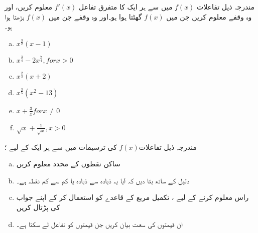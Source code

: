 مندرجہ ذیل تفاعلات 	  \(f(x)\) 	میں سے ہر ایک کا متفرق تفاعل 	\( f\prime (x)\)	معلوم کریں، اور وہ وقفے معلوم کریں جن میں 	  \(f(x)\) 	گھٹتا ہوا ہو۔اور وہ وقفے جن میں 		  \(f(x)\) بڑھتا ہوا ہو۔
\begin{multicols}{3}
\begin{enumerate}[a.]
\item \(  x^{\frac{3}{2}}(x-1) \hspace{50pt}  \)
\item \(  x^{\frac{3}{4}}-2x^{\frac{7}{4}},for x>0 \hspace{50pt}   \)
\item  \(x^{\frac{2}{3}}(x+2)\)
\item  \(x^{\frac{3}{5}}(x^{2}-13) \hspace{50pt}  \)
\item  \( x+\frac{3}{x} for x\neq 0 \hspace{50pt}    \)
\item \( \sqrt{x}+\frac{1}{\sqrt{x}},x>0    \)
\end{enumerate}
\end{multicols}
مندرجہ ذیل تفاعلات\(f(x)\) کی ترسیمات میں سے ہر ایک کے لیے ؛
\begin{multicols}{3}
\begin{enumerate}[a.]
\item 
ساکن نقطوں کے محدد معلوم کریں
\item 
دلیل کے ساتھ بتا دیں کہ آیا یہ ذیادہ سے ذیادہ یا کم سے کم نقطہ ہے۔
\item  
راس معلوم کرنے کے لیے ، تکمیل مربع کے قاعدے کو استعمال کر کے اپنے جواب کی پڑتال کریں
\item  
ان قیمتوں کی سعت بیان کریں جن قیمتوں کو تفاعل 		لے سکتا ہے۔
\end{enumerate}
\end{multicols}

